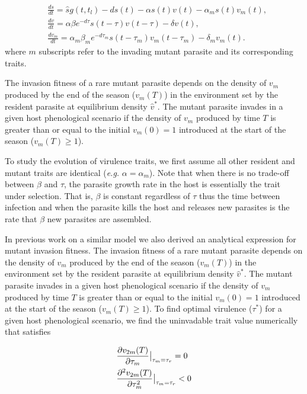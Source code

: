 \documentclass{article}
\begin{document}
\begin{align*}
&\frac{ds}{dt} = \hat{s}g(t,t_{l})- d s(t)- \alpha s(t)v(t) - \alpha_{m} s(t)v_{m}(t),\tag{2a}\\
&\frac{dv}{dt} = \alpha \beta e^{-d\tau} s(t-\tau)v(t-\tau)-\delta v(t),\tag{2b}\\
&\frac{dv_{m}}{dt} = \alpha_{m} \beta_{m} e^{-d\tau_{m}} s(t-\tau_{m})v_{m}(t-\tau_{m})-\delta_{m} v_{m}(t).\tag{2c}
\end{align*}
where $m$ subscripts refer to the invading mutant parasite and its corresponding traits.

The invasion fitness of a rare mutant parasite depends on the density of $v_{m}$ produced by the end of the season ($v_{m}(T)$) in the environment set by the resident parasite at equilibrium density $\hat{v}^*$. The mutant parasite invades in a given host phenological scenario if the density of $v_{m}$ produced by time $T$ is greater than or equal to the initial $v_{m}(0) = 1$ introduced at the start of the season ($v_{m}(T) \geq 1$).

To study the evolution of virulence traits, we first assume all other resident and mutant traits are identical (\textit{e.g.} $\alpha=\alpha_{m}$). Note that when there is no trade-off between $\beta$ and $\tau$, the parasite growth rate in the host is essentially the trait under selection. That is, $\beta$ is constant regardless of $\tau$ thus the time between infection and when the parasite kills the host and releases new parasites is the rate that $\beta$ new parasites are assembled. 

In previous work on a similar model we also derived an analytical expression for mutant invasion fitness\cite{macdonald2021host}. The invasion fitness of a rare mutant parasite depends on the density of $v_{m}$ produced by the end of the season ($v_{m}(T)$) in the environment set by the resident parasite at equilibrium density $\hat{v}^*$. The mutant parasite invades in a given host phenological scenario if the density of $v_{m}$ produced by time $T$ is greater than or equal to the initial $v_{m}(0) = 1$ introduced at the start of the season ($v_{m}(T) \geq 1$). To find optimal virulence ($\tau^*$) for a given host phenological scenario, we find the uninvadable trait value numerically that satisfies

\begin{align*}
  &\evalat{\frac{\partial v_{2m}(T)}{\partial\tau_{m}}}{\tau_{m}=\tau_{r}}=0\\
  &\evalat{\frac{\partial^2v_{2m}(T)}{\partial\tau_{m}^2}}{\tau_{m}=\tau_{r}}<0
\end{align*}
\end{document}
